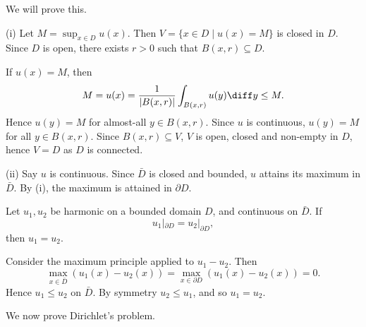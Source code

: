 \documentclass[12pt]{article}
\begin{document}
We will prove this.
\begin{proofbox}
	
	(i) Let $M = \sup_{x \in D} u(x)$. Then $V = \{x \in D \mid u(x) = M\}$ is closed in $D$. Since $D$ is open, there exists $r > 0$ such that $B(x, r) \subseteq D$.

	If $u(x) = M$, then
	\[
	M = u(x) = \frac{1}{|B(x, r)|} \int_{B(x, r)} u(y) \diff y \leq M.
	\]
	Hence $u(y) = M$ for almost-all $y \in B(x, r)$. Since $u$ is continuous, $u(y) = M$ for all $y \in B(x, r)$. Since $B(x, r) \subseteq V$, $V$ is open, closed and non-empty in $D$, hence $V = D$ as $D$ is connected.

	(ii) Say $u$ is continuous. Since $\bar D$ is closed and bounded, $u$ attains its maximum in $\bar D$. By (i), the maximum is attained in $\partial D$.
\end{proofbox}

\begin{corollary}
	Let $u_1, u_2$ be harmonic on a bounded domain $D$, and continuous on $\bar D$. If
	\[
	u_1|_{\partial D} = u_2|_{\partial D},
	\]
	then $u_1 = u_2$.
\end{corollary}

\begin{proofbox}
	Consider the maximum principle applied to $u_1 - u_2$. Then
	\[
	\max_{x \in \bar D} (u_1(x) - u_2(x)) = \max_{x \in \partial D} (u_1(x) - u_2(x)) = 0.
	\]
	Hence $u_1 \leq u_2$ on $\bar D$. By symmetry $u_2 \leq u_1$, and so $u_1 = u_2$.
\end{proofbox}

We now prove Dirichlet's problem.
\end{document}

